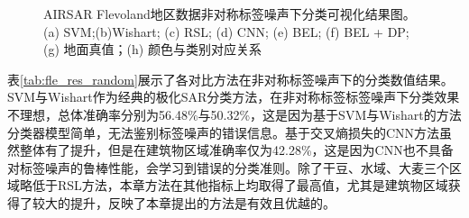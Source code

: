 \begin{figure}[ht!]

    \caption{AIRSAR Flevoland地区数据非对称标签噪声下分类可视化结果图。(a) SVM;(b)Wishart; (c) RSL; (d) CNN; (e) BEL; (f) BEL + DP; (g) 地面真值；(h) 颜色与类别对应关系}
    \label{fig:fle_random}
\end{figure}


表\ref{tab:fle_res_random}展示了各对比方法在非对称标签噪声下的分类数值结果。SVM与Wishart作为经典的极化SAR分类方法，在非对称标签标签噪声下分类效果不理想，总体准确率分别为56.48\%与50.32\%，这是因为基于SVM与Wishart的方法分类器模型简单，无法鉴别标签噪声的错误信息。基于交叉熵损失的CNN方法虽然整体有了提升，但是在建筑物区域准确率仅为42.28\%，这是因为CNN也不具备对标签噪声的鲁棒性能，会学习到错误的分类准则。除了干豆、水域、大麦三个区域略低于RSL方法，本章方法在其他指标上均取得了最高值，尤其是建筑物区域获得了较大的提升，反映了本章提出的方法是有效且优越的。

